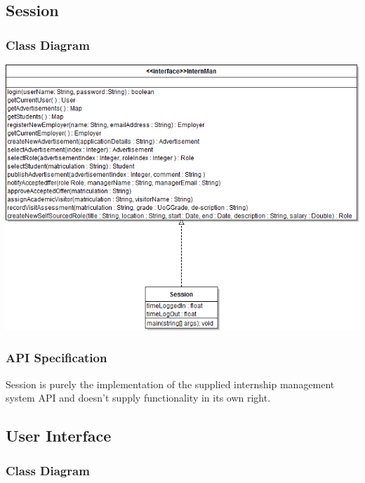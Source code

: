 \documentclass[11pt]{l3deliverable}
\begin{document}
\subsection{Session}

\subsubsection{Class Diagram}

\includegraphics[scale=0.65,angle=90]{SessionClassDiagram.png}

\subsubsection{API Specification}

Session is purely the implementation of the supplied internship management
system API and doesn't supply functionality in its own right.

\newpage

\subsection{User Interface}

\subsubsection{Class Diagram}
\end{document}
